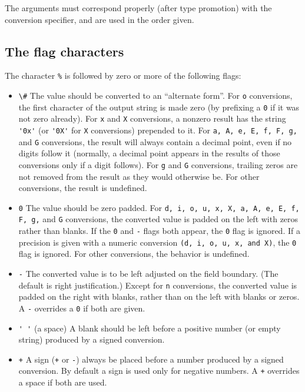 The  arguments must correspond properly (after type promotion) with the
conversion specifier, and are used in the order given.

\subsection{The flag characters}

The character \verb|%| is followed by zero or more of the following flags:
\begin{itemize}
\item  \verb|\#|   The  value  should be converted to an ``alternate form''.  For \verb|o| conversions, the first character of the output  string  is  made  zero (by prefixing a \verb|0| if it was not zero already).  For \verb|x| and \verb|X| conversions, a nonzero result has the string \verb|'0x'| (or \verb|'0X'| for  \verb|X|  conversions) prepended to it.  For \verb|a, A, e, E, f, F, g,| and \verb|G|  conversions, the result will always  contain  a  decimal  point,  even  if  no digits follow it (normally, a decimal point appears  in the results of those conversions only if  a  digit  follows).  For \verb|g| and \verb|G| conversions, trailing zeros are not removed from the  result as they would otherwise be.  For other  conversions,  the  result is undefined.

\item  \verb|0|   The value should be zero padded.  For \verb|d, i, o, u, x, X, a, A, e, E, f, F, g,| and \verb|G| conversions, the converted value is padded  on the  left  with  zeros rather than blanks.  If the \verb|0| and \verb|-| flags  both appear, the \verb|0| flag is ignored.  If  a  precision  is  given  with  a numeric conversion \verb|(d, i, o, u, x, and X)|, the \verb|0| flag is  ignored.  For other conversions, the behavior is undefined.

\item  \verb|-|   The converted value is to be left adjusted on the  field  boundary.  (The default is right justification.) Except for \verb|n| conversions, the converted value is padded on the right  with  blanks, rather than on the left with blanks or zeros.  A \verb|-| overrides a \verb|0| if both are given.

\item  \verb|' '| (a space) A blank should be left before a  positive  number  (or empty string) produced by a signed conversion.

\item  \verb|+| A  sign  (\verb|+| or \verb|-|) always be placed before a number produced by a signed conversion.  By default a sign is used only for  negative numbers. A \verb|+| overrides a space if both are used.

\end{itemize}

